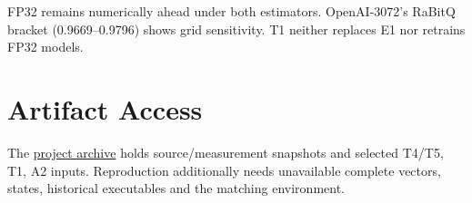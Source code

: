 FP32 remains numerically ahead under both estimators. OpenAI-3072's RaBitQ bracket (0.9669--0.9796) shows grid sensitivity. T1 neither replaces E1 nor retrains FP32 models.

\section{Artifact Access}
\label{sec:b-artifacts}
The \href{https://github.com/lrlorry/8800_report/blob/main/docs/artifact-access.md}{project archive} holds source/measurement snapshots and selected T4/T5, T1, A2 inputs. Reproduction additionally needs unavailable complete vectors, states, historical executables and the matching environment.